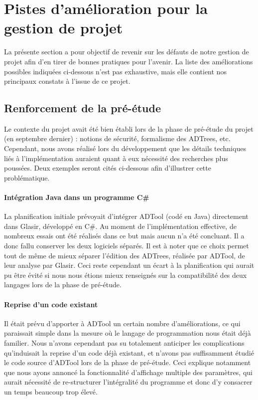 \section{Pistes d'amélioration pour la gestion de projet}
\label{sec:plusMieux}

La présente section a pour objectif de revenir sur les défauts de notre gestion de projet afin d'en tirer de bonnes pratiques pour l'avenir. La liste des améliorations possibles indiquées ci-dessous n'est pas exhaustive, mais elle contient nos principaux constats à l'issue de ce projet.

\subsection{Renforcement de la pré-étude}
\label{ssec:pre-etude}

Le contexte du projet avait été bien établi lors de la phase de pré-étude du projet (en septembre dernier) : notions de sécurité, formalisme des ADTrees, etc. Cependant, nous avons réalisé lors du développement que les détails techniques liés à l'implémentation auraient quant à eux nécessité des recherches plus poussées. Deux exemples seront cités ci-dessous afin d'illustrer cette problématique.

\paragraph{Intégration Java dans  un programme C\#} La planification initiale prévoyait d'intégrer ADTool (codé en Java) directement dans Glasir, développé en C\#. Au moment de l'implémentation effective, de nombreux essais ont été réalisés dans ce but mais aucun n'a été concluant. Il a donc fallu conserver les deux logiciels séparés. Il est à noter que ce choix permet tout de même de mieux séparer l'édition des ADTrees, réalisée par ADTool, de leur analyse par Glasir. Ceci reste cependant un écart à la planification qui aurait pu être évité si nous nous étions mieux renseignés sur la compatibilité des deux langages lors de la phase de pré-étude.

\paragraph{Reprise d'un code existant} Il était prévu d'apporter à ADTool un certain nombre d'améliorations, ce qui paraissait simple dans la mesure où le langage de programmation nous était déjà familier. Nous n'avons cependant pas su totalement anticiper les complications qu'induisait la reprise d'un code déjà existant, et n'avons pas suffisamment étudié le code source d'ADTool lors de la phase de pré-étude. Ceci explique notamment que nous ayons annoncé la fonctionnalité d'affichage multiple des paramètres, qui aurait nécessité de re-structurer l'intégralité du programme et donc d'y consacrer un temps beaucoup trop élevé.

